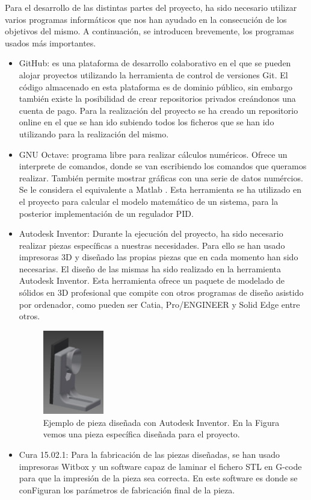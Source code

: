Para el desarrollo de las distintas partes del proyecto, ha sido necesario utilizar varios programas informáticos que nos han ayudado en la consecución de los objetivos del mismo. A continuación, se introducen brevemente, los programas usados más importantes.
\begin{itemize}
\item{GitHub: es una plataforma de desarrollo colaborativo en el que se pueden alojar proyectos utilizando la herramienta de control de versiones Git. El código almacenado en esta plataforma es de dominio público, sin embargo también existe la posibilidad de crear repositorios privados creándonos una cuenta de pago. Para la realización del proyecto se ha creado un repositorio online \cite{githubTFG} en el que se han ido subiendo todos los ficheros que se han ido utilizando para la realización del mismo.}

\item{GNU Octave:  programa libre para realizar cálculos numéricos. Ofrece un interprete de comandos, donde se van escribiendo los comandos que queramos realizar. También permite mostrar gráficas con una serie de datos numércios. Se le considera el equivalente a Matlab \cite{octave}. Esta herramienta se ha utilizado en el proyecto para calcular el modelo matemático de un sistema, para la posterior implementación de un regulador PID.}

\item{Autodesk Inventor: 
Durante la ejecución del proyecto, ha sido necesario realizar piezas específicas a nuestras necesidades. Para ello se han usado impresoras 3D y diseñado las propias piezas que en cada momento han sido necesarias. El diseño de las mismas ha sido realizado en la herramienta Autodesk Inventor. Esta herramienta ofrece un paquete de modelado de sólidos en 3D profesional que compite con otros programas de diseño asistido por ordenador, como pueden ser Catia, Pro/ENGINEER y Solid Edge entre otros.

\begin{figure}[H]
    \centering
    \includegraphics[width=0.25\textwidth]{images/peletizadora/guia.png}
    \caption[Ejemplo de pieza diseñada con Autodesk Inventor.]{Ejemplo de pieza diseñada con Autodesk Inventor. En la Figura vemos una pieza específica diseñada para el proyecto.}
    \label{fig:pieza}
\end{figure}
}
\item{Cura 15.02.1: 
Para la fabricación de las piezas diseñadas, se han usado impresoras Witbox y un software capaz de laminar el fichero STL en G-code para que la impresión de la pieza sea correcta. En este software es donde se conFiguran los parámetros de fabricación final de la pieza.

}
\end{itemize}
